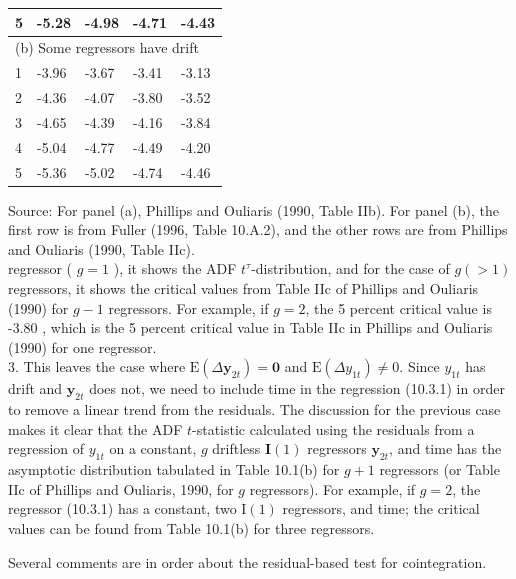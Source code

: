 \documentclass[10pt]{article}
\begin{document}
\begin{table}[h]
\begin{center}
\begin{tabular}{|l|l|l|l|l|}
\hline
5 & -5.28 & -4.98 & -4.71 & -4.43 \\
\hline
\multicolumn{5}{|l|}{(b) Some regressors have drift} \\
\hline
1 & -3.96 & -3.67 & -3.41 & -3.13 \\
\hline
2 & -4.36 & -4.07 & -3.80 & -3.52 \\
\hline
3 & -4.65 & -4.39 & -4.16 & -3.84 \\
\hline
4 & -5.04 & -4.77 & -4.49 & -4.20 \\
\hline
5 & -5.36 & -5.02 & -4.74 & -4.46 \\
\hline
\end{tabular}
\end{center}
\end{table}

Source: For panel (a), Phillips and Ouliaris (1990, Table IIb). For panel (b), the first row is from Fuller (1996, Table 10.A.2), and the other rows are from Phillips and Ouliaris (1990, Table IIc).\\
regressor ( $g=1$ ), it shows the ADF $t^{\tau}$-distribution, and for the case of $g(>1)$ regressors, it shows the critical values from Table IIc of Phillips and Ouliaris (1990) for $g-1$ regressors. For example, if $g=2$, the 5 percent critical value is -3.80 , which is the 5 percent critical value in Table IIc in Phillips and Ouliaris (1990) for one regressor.\\
3. This leaves the case where $\mathrm{E}\left(\Delta \mathbf{y}_{2 t}\right)=\mathbf{0}$ and $\mathrm{E}\left(\Delta y_{1 t}\right) \neq 0$. Since $y_{1 t}$ has drift and $\mathbf{y}_{2 t}$ does not, we need to include time in the regression (10.3.1) in order to remove a linear trend from the residuals. The discussion for the previous case makes it clear that the ADF $t$-statistic calculated using the residuals from a regression of $y_{1 t}$ on a constant, $g$ driftless $\mathbf{I}(1)$ regressors $\mathbf{y}_{2 t}$, and time has the asymptotic distribution tabulated in Table 10.1(b) for $g+1$ regressors (or Table IIc of Phillips and Ouliaris, 1990, for $g$ regressors). For example, if $g=2$, the regressor (10.3.1) has a constant, two $\mathrm{I}(1)$ regressors, and time; the critical values can be found from Table 10.1(b) for three regressors.

Several comments are in order about the residual-based test for cointegration.
\end{document}
